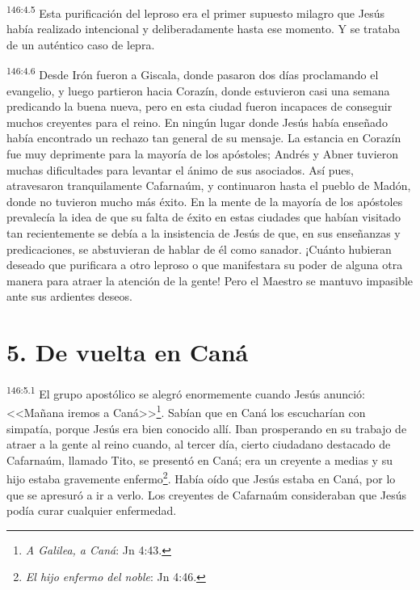 \par 
\textsuperscript{146:4.5} Esta purificación del leproso era el primer supuesto milagro que Jesús había realizado intencional y deliberadamente hasta ese momento. Y se trataba de un auténtico caso de lepra.

\par 
\textsuperscript{146:4.6} Desde Irón fueron a Giscala, donde pasaron dos días proclamando el evangelio, y luego partieron hacia Corazín, donde estuvieron casi una semana predicando la buena nueva, pero en esta ciudad fueron incapaces de conseguir muchos creyentes para el reino. En ningún lugar donde Jesús había enseñado había encontrado un rechazo tan general de su mensaje. La estancia en Corazín fue muy deprimente para la mayoría de los apóstoles; Andrés y Abner tuvieron muchas dificultades para levantar el ánimo de sus asociados. Así pues, atravesaron tranquilamente Cafarnaúm, y continuaron hasta el pueblo de Madón, donde no tuvieron mucho más éxito. En la mente de la mayoría de los apóstoles prevalecía la idea de que su falta de éxito en estas ciudades que habían visitado tan recientemente se debía a la insistencia de Jesús de que, en sus enseñanzas y predicaciones, se abstuvieran de hablar de él como sanador. ¡Cuánto hubieran deseado que purificara a otro leproso o que manifestara su poder de alguna otra manera para atraer la atención de la gente! Pero el Maestro se mantuvo impasible ante sus ardientes deseos.

\section*{5. De vuelta en Caná}
\par 
\textsuperscript{146:5.1} El grupo apostólico se alegró enormemente cuando Jesús anunció: <<Mañana iremos a Caná>>\footnote{\textit{A Galilea, a Caná}: Jn 4:43.}. Sabían que en Caná los escucharían con simpatía, porque Jesús era bien conocido allí. Iban prosperando en su trabajo de atraer a la gente al reino cuando, al tercer día, cierto ciudadano destacado de Cafarnaúm, llamado Tito, se presentó en Caná; era un creyente a medias y su hijo estaba gravemente enfermo\footnote{\textit{El hijo enfermo del noble}: Jn 4:46.}. Había oído que Jesús estaba en Caná, por lo que se apresuró a ir a verlo. Los creyentes de Cafarnaúm consideraban que Jesús podía curar cualquier enfermedad.

